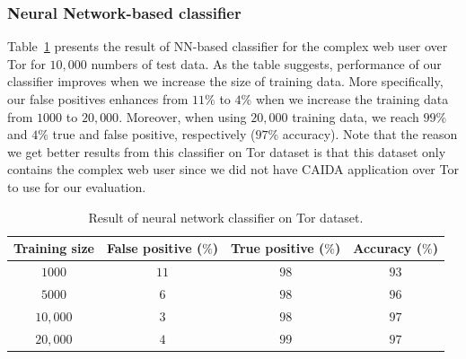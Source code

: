 \subsubsection{Neural Network-based classifier}
Table~\ref{tab:nn_tor} presents the result of NN-based classifier for the complex web user over Tor for $10,000$ numbers of test data. As the table suggests, performance of our classifier improves when we increase the size of training data. More specifically, our false positives enhances from $11\%$ to $4\%$ when we increase the training data from $1000$ to $20,000$. Moreover, when using $20,000$ training data, we reach $99\%$ and $4\%$ true and false positive, respectively ($97\%$ accuracy). Note that the reason we get better results from this classifier on Tor dataset is that this dataset only contains the complex web user since we did not have CAIDA application over Tor to use for our evaluation.

\begin{table}
\center \caption{Result of neural network classifier on Tor dataset.}\label{tab:nn_tor}
\begin{tabular}{|c|c|c|c|}
\hline
 Training size& False positive ($\%$) &True positive ($\%$)&Accuracy ($\%$)\\
      \hline
	$1000$&$11$ &$98 $  & $93$\\
	$5000$&$6$& $98$  & $96$\\
	$10,000$&$3$& $98$  &$ 97$\\
	$20,000$&$4$& $99$   & $97$\\
\hline
\end{tabular}
\end{table}


